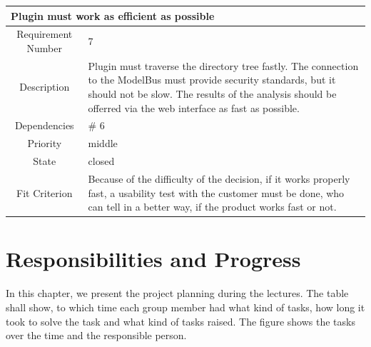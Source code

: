 \begin{longtable}{|c|p{10cm}|}
\hline 
\multicolumn{2}{|l|}{\textbf{Plugin must work as efficient as possible}} \\ 
\hline 
Requirement Number & 7 \\ \hline 
Description & Plugin must traverse the directory tree fastly. The connection to the ModelBus must provide security standards, but it should not be slow. The results of the analysis should be offerred via the web interface as fast as possible. \\ \hline 
Dependencies & \# 6 \\ \hline 
Priority & middle \\ \hline 
State & closed \\ \hline 
Fit Criterion & Because of the difficulty of the decision, if it works properly fast, a usability test with the customer must be done, who can tell in a better way, if the product works fast or not. \\ \hline
\end{longtable}

\section{Responsibilities and Progress}
In this chapter, we present the project planning during the lectures. The table shall show, to which time each group member had what kind of tasks, how long it took to solve the task and what kind of tasks raised. The figure shows the tasks over the time and the responsible person.

